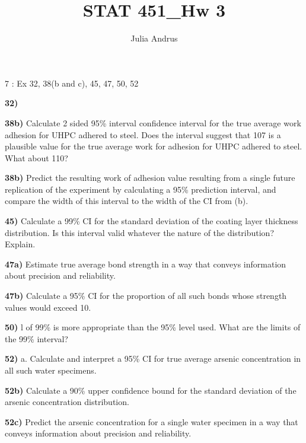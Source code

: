 \documentclass{article}
\title{STAT 451\_Hw 3}
\author{Julia Andrus}
\date{}
\begin{document}
\maketitle 

 7 : Ex 32, 38(b and c), 45, 47, 50, 52

\textbf{32)}





 
\newpage
\textbf{38b)} Calculate 2 sided 95\% interval confidence interval for the true average work adhesion for UHPC adhered to steel. Does the interval suggest that 107 is a plausible value for the true average work for adhesion for UHPC adhered to steel. What about 110?



\textbf{38b)} Predict the resulting work of adhesion value resulting from a single future replication of the experiment by calculating a 95\% prediction interval, and compare the
width of this interval to the width of the CI from (b).

\newpage
\textbf{45)} Calculate a 99\% CI for the standard deviation of the coating layer thickness distribution. Is this interval valid whatever the nature of the distribution? Explain.

 
\newpage
\textbf{47a)}  Estimate true average bond strength in a way that conveys information about precision and reliability.

\textbf{47b)} Calculate a 95\% CI for the proportion of all such bonds whose strength values would exceed 10.

\newpage
\textbf{50)} l of 99\% is more appropriate than the 95\% level used. What are the limits of the 99\% interval?


\newpage
\textbf{52)} a. Calculate and interpret a 95\% CI for true average arsenic concentration in all such water specimens.

\textbf{52b)} Calculate a 90\% upper confidence bound for the standard deviation of the arsenic concentration distribution.


\textbf{52c)} Predict the arsenic concentration for a single water specimen in a way that conveys information about precision and reliability.
\end{document}
